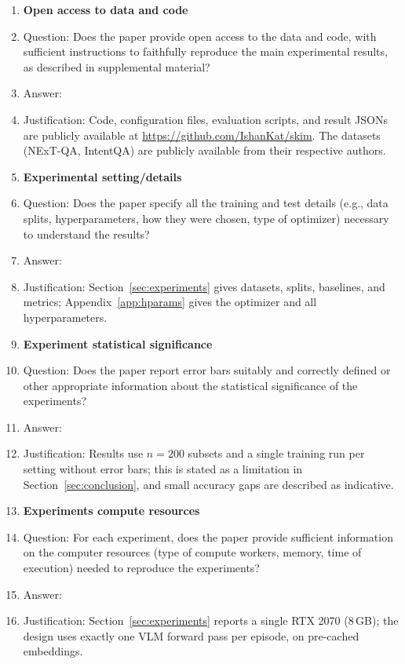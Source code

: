 \begin{enumerate}
\item {\bf Open access to data and code}
    \item[] Question: Does the paper provide open access to the data and code, with sufficient instructions to faithfully reproduce the main experimental results, as described in supplemental material?
    \item[] Answer: \answerYes{}
    \item[] Justification: Code, configuration files, evaluation scripts, and result JSONs are publicly available at \url{https://github.com/IshanKat/skim}. The datasets (NExT-QA, IntentQA) are publicly available from their respective authors.

\item {\bf Experimental setting/details}
    \item[] Question: Does the paper specify all the training and test details (e.g., data splits, hyperparameters, how they were chosen, type of optimizer) necessary to understand the results?
    \item[] Answer: \answerYes{}
    \item[] Justification: Section~\ref{sec:experiments} gives datasets, splits, baselines, and metrics; Appendix~\ref{app:hparams} gives the optimizer and all hyperparameters.

\item {\bf Experiment statistical significance}
    \item[] Question: Does the paper report error bars suitably and correctly defined or other appropriate information about the statistical significance of the experiments?
    \item[] Answer: \answerNo{}
    \item[] Justification: Results use $n{=}200$ subsets and a single training run per setting without error bars; this is stated as a limitation in Section~\ref{sec:conclusion}, and small accuracy gaps are described as indicative.

\item {\bf Experiments compute resources}
    \item[] Question: For each experiment, does the paper provide sufficient information on the computer resources (type of compute workers, memory, time of execution) needed to reproduce the experiments?
    \item[] Answer: \answerYes{}
    \item[] Justification: Section~\ref{sec:experiments} reports a single RTX 2070 (8\,GB); the design uses exactly one VLM forward pass per episode, on pre-cached embeddings.


\end{enumerate}
